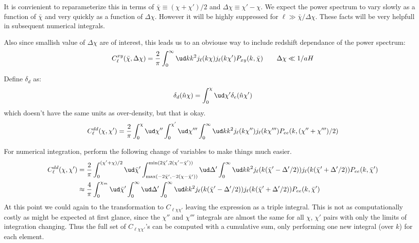 \begin{widetext}
It is convienient to reparameterize this in terms of
$\bar\chi \equiv (\chi + \chi') /2$ and $\Delta \chi \equiv \chi' - \chi$.
We expect the power spectrum to vary slowly as a function of $\bar\chi$ and
very quickly as a function of $\Delta\chi$. However it will be highly
suppressed for $\ell \gg \bar\chi/\Delta\chi$. These facts will be very
helpfull in subsequent numerical integrals.

Also since smallish value of $\Delta\chi$ are of interest, this leads us to
an obviouse way to include redshift dependance of the
power spectrum:
\begin{equation}
C^{xy}_\ell(\bar\chi,\Delta\chi) 
    = \frac{2}{\pi}
    \int_0^\infty\ud k k^2
    j_\ell(k\chi) j_{\ell}(k\chi')
    P_{xy}(k,\bar\chi) \qquad \Delta\chi \ll 1/aH
\end{equation}

Define $\delta_d$ as:
\begin{equation}
    \delta_d(\hat n \chi) = \int_0^\chi \ud \chi' \delta_e(\hat n \chi')
\end{equation}
which doesn't have the same units as over-density, but that is okay.
\begin{equation}
C^{dd}_\ell(\chi,\chi')
    =
    \frac{2}{\pi}
    \int_0^\chi\ud\chi''
    \int_0^{\chi'}\ud\chi'''
    \int_0^\infty\ud k k^2 j_\ell(k\chi'') j_{\ell}(k\chi'''
    )P_{ee}(k, (\chi''+\chi''')/2)
\end{equation}

For numerical integration, perform the following change of variables to make
things much easier.
\begin{align}
C^{dd}_\ell(\chi,\chi')
&=
    \frac{2}{\pi}
    \int_0^{(\chi' + \chi)/2}\ud\bar\chi'
    \int_{\max(-2\bar\chi', -2(\chi -\bar\chi'))}^{\min(2\bar\chi', 2(\chi' -
    \bar\chi'))}\ud\Delta'
    \int_0^\infty\ud k k^2 j_\ell(k(\bar\chi' - \Delta'/2))
    j_{\ell}(k(\bar\chi' + \Delta'/2))
    P_{ee}(k, \bar\chi')
    \\
    &\approx
    \frac{4}{\pi}
    \int_0^{\chi_m}\ud\bar\chi'
    \int_{0}^{\infty}\ud\Delta'
    \int_0^\infty\ud k k^2 j_\ell(k(\bar\chi' - \Delta'/2))
    j_{\ell}(k(\bar\chi' + \Delta'/2))
    P_{ee}(k, \bar\chi')
\end{align}
At this point we could again to the transformation to $C_{\ell\chi\chi'}$
leaving the expression as a triple integral. This is not as computationally
costly as might be expected at first glance, since the $\chi''$ and $\chi'''$
integrals are almost the same for all $\chi$, $\chi'$ pairs with only the
limits of integration changing. Thus the full set of $C_{\ell\chi\chi'}$'s can
be computed with a cumulative sum, only performing one new integral (over $k$)
for each element.


\end{widetext}
